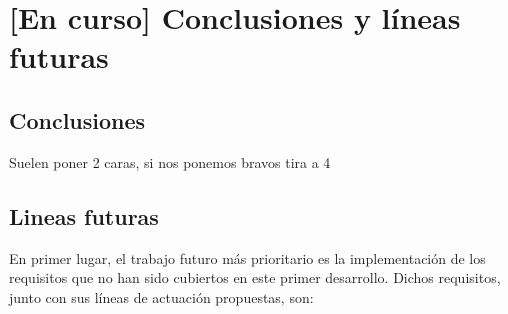 \chapter{[En curso] Conclusiones y líneas futuras}
\label{chapter:conclusiones}


\section{Conclusiones}

Suelen poner 2 caras, si nos ponemos bravos tira a 4

\section{Lineas futuras}
    \label{section:lineas_futuras}
    
    En primer lugar, el trabajo futuro más prioritario es la implementación de los requisitos que no han sido cubiertos en este primer desarrollo. Dichos requisitos, junto con sus líneas de actuación propuestas, son:

